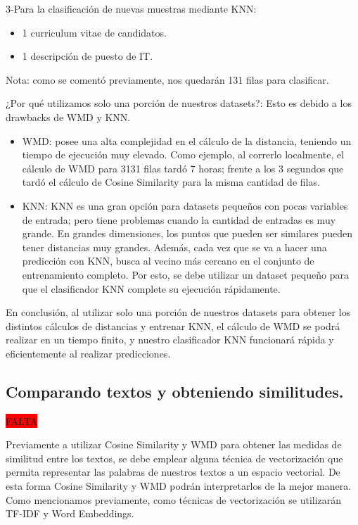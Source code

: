 \documentclass[12pt,a4paper]{article}
\begin{document}
\begin{sloppypar}
3-Para la clasificación de nuevas muestras mediante KNN:
\begin{itemize}
\item 1 curriculum vitae de candidatos.
\item 1 descripción de puesto de IT.
\end{itemize}
Nota: como se comentó previamente, nos quedarán 131 filas para clasificar.

¿Por qué utilizamos solo una porción de nuestros datasets?: Esto es debido a los drawbacks de WMD y KNN.
\begin{itemize}
\item WMD: posee una alta complejidad en el cálculo de la distancia, teniendo un tiempo de ejecución muy elevado. Como ejemplo, al correrlo localmente, el cálculo de WMD para 3131 filas tardó 7 horas; frente a los 3 segundos que tardó el cálculo de Cosine Similarity para la misma cantidad de filas.
\item KNN: KNN es una gran opción para datasets pequeños con pocas variables de entrada; pero tiene problemas cuando la cantidad de entradas es muy grande. En grandes dimensiones, los puntos que pueden ser similares pueden tener distancias muy grandes. Además, cada vez que se va a hacer una predicción con KNN, busca al vecino más cercano en el conjunto de entrenamiento completo. Por esto, se debe utilizar un dataset pequeño para que el clasificador KNN complete su ejecución rápidamente.
\end{itemize}
En conclusión, al utilizar solo una porción de nuestros datasets para obtener los distintos cálculos de distancias y entrenar KNN, el cálculo de WMD se podrá realizar en un tiempo finito, y nuestro clasificador KNN funcionará rápida y eficientemente al realizar predicciones.

\cleardoublepage

\subsection{Comparando textos y obteniendo similitudes.}
\colorbox{red}{FALTA}

Previamente a utilizar Cosine Similarity y WMD para obtener las medidas de similitud entre los textos, se debe emplear alguna técnica de vectorización que permita representar las palabras de nuestros textos a un espacio vectorial. De esta forma Cosine Similarity y WMD podrán interpretarlos de la mejor manera.  Como mencionamos previamente, como técnicas de vectorización se utilizarán TF-IDF y Word Embeddings. 


\end{sloppypar}
\end{document}
